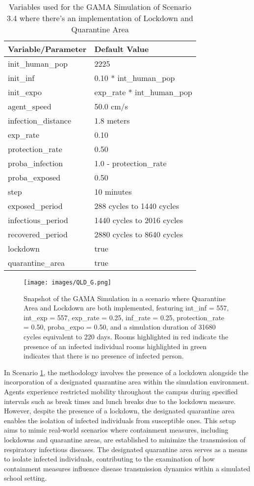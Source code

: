 \begin{table}[H]
	\centering
	\begin{tabular}{ll}
		\toprule
		\textbf{Variable/}\textbf{Parameter} & \textbf{Default Value}\\
		\hline
		init\_human\_pop & 2225\\
		init\_inf & 0.10 * int\_human\_pop\\
		init\_expo & exp\_rate * int\_human\_pop \\
		agent\_speed & 50.0 cm/s\\
		infection\_distance & 1.8 meters\\
		exp\_rate & 0.10\\
		protection\_rate & 0.50\\
		proba\_infection & 1.0 - protection\_rate\\
		proba\_exposed & 0.50\\
		step & 10 minutes\\
		exposed\_period & 288 cycles to 1440 cycles\\
		infectious\_period & 1440 cycles to 2016 cycles\\
		recovered\_period & 2880 cycles to 8640 cycles\\ 
		lockdown & true\\
		quarantine\_area & true\\
		\bottomrule
	\end{tabular}
	\caption{Variables used for the GAMA Simulation of Scenario 3.4 where there's an implementation of Lockdown and Quarantine Area}
	\label{3.2D}
\end{table}
		\begin{figure}[H]
	\centering
	\texttt{[image: images/QLD\_G.png]}
	\caption{Snapshot of the GAMA Simulation in a scenario where Quarantine Area and Lockdown are both implemented, featuring int\_inf = 557, int\_exp = 557, exp\_rate = 0.25, inf\_rate = 0.25, protection\_rate = 0.50, proba\_expo = 0.50, and a simulation duration of 31680 cycles equivalent to 220 days. Rooms highlighted in red indicate the presence of an infected individual rooms highlighted in green indicates that there is no presence of infected person.}
	\label{3.4G}
\end{figure}
In Scenario \ref{3.2D}, the methodology involves the presence of a lockdown alongside the incorporation of a designated quarantine area within the simulation environment. Agents experience restricted mobility throughout the campus during specified intervals such as break times and lunch breaks due to the lockdown measure. However, despite the presence of a lockdown, the designated quarantine area enables the isolation of infected individuals from susceptible ones. This setup aims to mimic real-world scenarios where containment measures, including lockdowns and quarantine areas, are established to minimize the transmission of respiratory infectious diseases. The designated quarantine area serves as a means to isolate infected individuals, contributing to the examination of how containment measures influence disease transmission dynamics within a simulated school setting.

